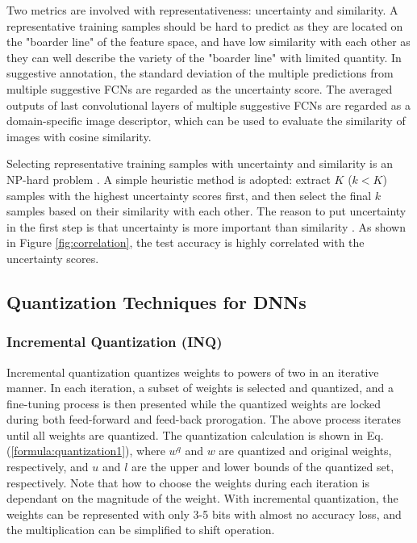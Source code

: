 \documentclass[10pt,twocolumn,letterpaper]{article}
\begin{document}
Two metrics are involved with representativeness: uncertainty and similarity.
A representative training samples should be hard to predict as they are located on the "boarder line" of the feature space, and have low similarity with each other as they can well describe the variety of the "boarder line" with limited quantity.
In suggestive annotation, the standard deviation of the multiple predictions from multiple suggestive FCNs are regarded as the uncertainty score.
The averaged outputs of last convolutional layers of multiple suggestive FCNs are regarded as a domain-specific image descriptor, which can be used to evaluate the similarity of images with cosine similarity.

Selecting representative training samples with uncertainty and similarity is an NP-hard problem \cite{yang2017suggestive}.
A simple heuristic method is adopted: extract $K$ ($k<K$) samples with the highest uncertainty scores first, and then select the final $k$ samples based on their similarity with each other.
The reason to put uncertainty in the first step is that uncertainty is more important than similarity \cite{yang2017suggestive}.
As shown in Figure \ref{fig:correlation}, the test accuracy is highly correlated with the uncertainty scores.

\subsection{Quantization Techniques for DNNs}
\subsubsection{Incremental Quantization (INQ)}


Incremental quantization \cite{zhou2017incremental} quantizes weights to powers of two in an iterative manner.
In each iteration, a subset of weights is selected and quantized, and a fine-tuning process is then presented while the quantized weights are locked during both feed-forward and feed-back prorogation.
The above process iterates until all weights are quantized.
The quantization calculation is shown in Eq. (\ref{formula:quantization1}), where $w^q$ and $w$ are quantized and original weights, respectively, and $u$ and $l$ are the upper and lower bounds of the quantized set, respectively.
Note that how to choose the weights during each iteration is dependant on the magnitude of the weight.
With incremental quantization, the weights can be represented with only 3-5 bits with almost no accuracy loss, and the multiplication can be simplified to shift operation.
\end{document}
